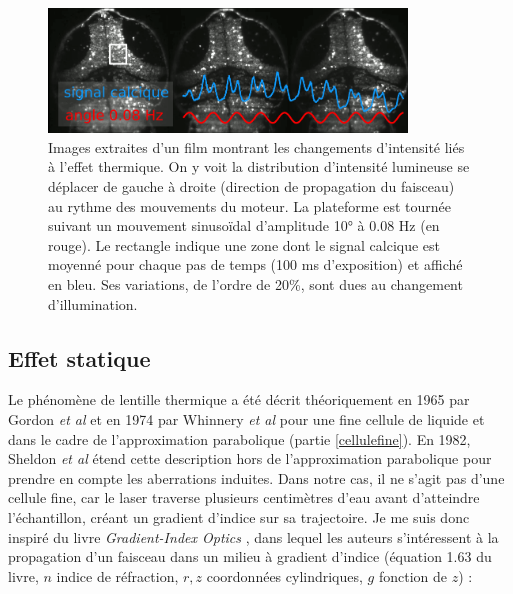 
\begin{figure}
    \centering
    \includegraphics[width=0.85\textwidth]{./files/water_instability.svg.png}
    \caption{Images extraites d'un film montrant les changements d'intensité liés à l'effet thermique. On y voit la distribution d'intensité lumineuse se déplacer de gauche à droite (direction de propagation du faisceau) au rythme des mouvements du moteur. La plateforme est tournée suivant un mouvement sinusoïdal d'amplitude 10° à 0.08 Hz (en rouge). Le rectangle indique une zone dont le signal calcique est moyenné pour chaque pas de temps (100 ms d'exposition) et affiché en bleu. Ses variations, de l'ordre de 20\%, sont dues au changement d'illumination.
    \label{FIGwaterinstability}}
    \end{figure}




\subsection{Effet statique}


Le phénomène de lentille thermique a été décrit théoriquement en 1965 par Gordon \emph{et al} \cite{gordon_longtransient_1965} et en 1974 par Whinnery \emph{et al} \cite{whinnery_laser_1974} pour une fine cellule de liquide et dans le cadre de l'approximation parabolique (partie \ref{cellulefine}). En 1982, Sheldon \emph{et al} \cite{sheldon_laser-induced_1982} étend cette description hors de l'approximation parabolique pour prendre en compte les aberrations induites. Dans notre cas, il ne s'agit pas d'une cellule fine, car le laser traverse plusieurs centimètres d'eau avant d'atteindre l'échantillon, créant un gradient d'indice sur sa trajectoire. Je me suis donc inspiré du livre \emph{Gradient-Index Optics} \cite{gomez-reino_gradient-index_2002}, dans lequel les auteurs s'intéressent à la propagation d'un faisceau dans un milieu à gradient d'indice (équation 1.63 du livre, $n$ indice de réfraction, $r,z$ coordonnées cylindriques, $g$ fonction de $z$) :

